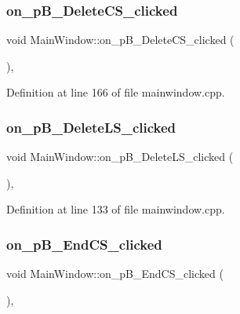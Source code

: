 \subsubsection{\texorpdfstring{on\+\_\+p\+B\+\_\+\+Delete\+C\+S\+\_\+clicked}{on\_pB\_DeleteCS\_clicked}}
{\footnotesize\ttfamily void Main\+Window\+::on\+\_\+p\+B\+\_\+\+Delete\+C\+S\+\_\+clicked (\begin{DoxyParamCaption}{ }\end{DoxyParamCaption})\hspace{0.3cm}{\ttfamily [private]}, {\ttfamily [slot]}}



Definition at line 166 of file mainwindow.\+cpp.

\mbox{\label{class_main_window_a445d582f73fbd30997386c7beac6d65e}} 
\subsubsection{\texorpdfstring{on\+\_\+p\+B\+\_\+\+Delete\+L\+S\+\_\+clicked}{on\_pB\_DeleteLS\_clicked}}
{\footnotesize\ttfamily void Main\+Window\+::on\+\_\+p\+B\+\_\+\+Delete\+L\+S\+\_\+clicked (\begin{DoxyParamCaption}{ }\end{DoxyParamCaption})\hspace{0.3cm}{\ttfamily [private]}, {\ttfamily [slot]}}



Definition at line 133 of file mainwindow.\+cpp.

\mbox{\label{class_main_window_a2f15b6d411d90a29219165631529e9d9}} 
\subsubsection{\texorpdfstring{on\+\_\+p\+B\+\_\+\+End\+C\+S\+\_\+clicked}{on\_pB\_EndCS\_clicked}}
{\footnotesize\ttfamily void Main\+Window\+::on\+\_\+p\+B\+\_\+\+End\+C\+S\+\_\+clicked (\begin{DoxyParamCaption}{ }\end{DoxyParamCaption})\hspace{0.3cm}{\ttfamily [private]}, {\ttfamily [slot]}}



